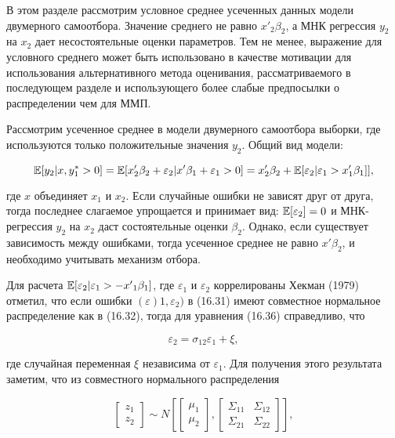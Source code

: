 В этом разделе рассмотрим условное среднее усеченных данных модели двумерного самоотбора. Значение среднего не равно $x'_{2}\beta_2$, а МНК регрессия $y_2$ на $x_2$ дает несостоятельные оценки параметров. Тем не менее, выражение для условного среднего может быть использовано в качестве мотивации для использования альтернативного метода оценивания, рассматриваемого в последующем разделе и использующего более слабые предпосылки о распределении чем для ММП. 

Рассмотрим усеченное среднее в модели двумерного самоотбора выборки, где используются только положительные значения $y_2$. Общий вид модели:

\begin{equation}
\mathbb{E}[y_2|x,y_1^{\ast}>0]=\mathbb{E}[x_2^{\prime}\beta_2+\varepsilon_2|x'\beta_1+\varepsilon_1>0] = x_2'\beta_2+\mathbb{E}[\varepsilon_2 | \varepsilon_1>x_1'\beta_1]],
\end{equation}

где $x$ объединяет $x_1$ и $x_2$. Если случайные ошибки не зависят друг от друга, тогда последнее слагаемое упрощается и принимает вид: $\mathbb{E}[\varepsilon_2]=0$ и МНК-регрессия $y_2$ на $x_2$ даст состоятельные оценки $\beta_2$. Однако, если существует зависимость между  ошибками, тогда усеченное среднее не равно $x'\beta_2$, и необходимо учитывать механизм отбора. 

Для расчета $\mathbb{E}[\varepsilon_2|\varepsilon_1>-{x'}_1\beta_1]$, где $\varepsilon_1$ и $\varepsilon_2$ коррелированы Хекман (1979) отметил, что если ошибки $(\varepsilon)1,\varepsilon_2)$ в (16.31) имеют совместное нормальное распределение как в (16.32), тогда для уравнения (16.36) справедливо, что 

\begin{equation}
\varepsilon_2=\sigma_{12}\varepsilon_1+\xi,
\end{equation} 

где случайная переменная $\xi$ независима от $\varepsilon_1$. Для получения этого результата заметим, что из совместного нормального распределения

\[
\begin{bmatrix}
z_1\\z_2
\end{bmatrix}
\sim
N
\left[
\begin{bmatrix}
{\mu}_1\\{\mu}_2
\end{bmatrix},
\begin{bmatrix}
\Sigma_{11}&\Sigma_{12} \\ \Sigma_{21}&\Sigma_{22}
\end{bmatrix}
\right],
\]

